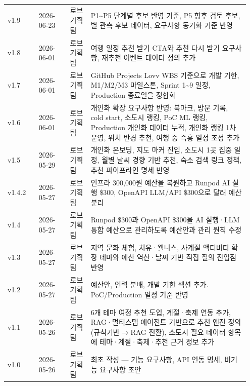 \documentclass[12pt,a4paper]{article}
\begin{document}
\begin{footnotesize}
\begin{longtable}{@{}>{\centering\arraybackslash}m{0.125\linewidth}>{\centering\arraybackslash}m{0.125\linewidth}>{\centering\arraybackslash}m{0.083\linewidth}>{\RaggedRight\arraybackslash}m{0.614\linewidth}@{}}
v1.9 & {\footnotesize 2026-\allowbreak{}06-\allowbreak{}23} & 로브 기획팀 & P1\textasciitilde{}P5 단계별 후보 반영 기준, P5 향후 검토 후보, 별 관측 후보 데이터, 요구사항 동기화 기준 반영 \\
v1.8 & {\footnotesize 2026-\allowbreak{}06-\allowbreak{}01} & 로브 기획팀 & 여행 일정 추천 받기 CTA와 추천 다시 받기 요구사항, 재추천 이벤트 데이터 정의 추가 \\
v1.7 & {\footnotesize 2026-\allowbreak{}06-\allowbreak{}01} & 로브 기획팀 & GitHub Projects Lovv WBS 기준으로 개발 기한, M1/M2/M3 마일스톤, Sprint 1\textasciitilde{}9 일정, Production 종료일을 정합화 \\
v1.6 & {\footnotesize 2026-\allowbreak{}06-\allowbreak{}01} & 로브 기획팀 & 개인화 확장 요구사항 반영: 북마크, 방문 기록, cold start, 소도시 랭킹, PoC ML 랭킹, Production 개인화 데이터 누적, 개인화 랭킹 1차 운영, 위치 반경 추천, 여행 중 즉흥 일정 조정 추가 \\
v1.5 & {\footnotesize 2026-\allowbreak{}05-\allowbreak{}29} & 로브 기획팀 & 개인화 온보딩, 지도 마커 진입, 소도시 1곳 집중 일정, 월별 날씨 경향 기반 추천, 숙소 검색 링크 정책, 추천 파이프라인 명세 반영 \\
v1.4.2 & {\footnotesize 2026-\allowbreak{}05-\allowbreak{}27} & 로브 기획팀 & 인프라 300,000원 예산을 복원하고 Runpod AI 실행 \$300, OpenAPI LLM/API \$300으로 달러 예산 분리 \\
v1.4 & {\footnotesize 2026-\allowbreak{}05-\allowbreak{}27} & 로브 기획팀 & Runpod \$300과 OpenAPI \$300을 AI 실행·LLM 통합 예산으로 관리하도록 예산안과 관리 원칙 수정 \\
v1.3 & {\footnotesize 2026-\allowbreak{}05-\allowbreak{}27} & 로브 기획팀 & 지역 문화 체험, 치유·웰니스, 사계절 액티비티 확장 테마와 예산 역산·날씨 기반 직접 질의 진입점 반영 \\
v1.2 & {\footnotesize 2026-\allowbreak{}05-\allowbreak{}27} & 로브 기획팀 & 예산안, 인력 분배, 개발 기한 섹션 추가. PoC/Production 일정 기준 반영 \\
v1.1 & {\footnotesize 2026-\allowbreak{}05-\allowbreak{}26} & 로브 기획팀 & 6개 테마 여정 추천 도입, 계절·축제 연동 추가, RAG·멀티스텝 에이전트 기반으로 추천 엔진 정의 (규칙기반$\rightarrow$RAG 전환), 소도시 필요 데이터 항목에 테마·계절·축제·추천 근거 정보 추가 \\
v1.0 & {\footnotesize 2026-\allowbreak{}05-\allowbreak{}26} & 로브 기획팀 & 최초 작성 --- 기능 요구사항, API 연동 명세, 비기능 요구사항 초안 \\
\bottomrule
\end{longtable}
\end{footnotesize}
\end{document}
